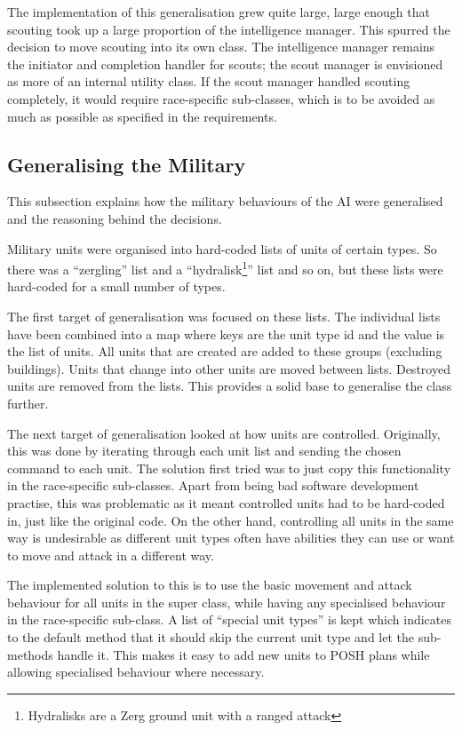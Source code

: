 \documentclass[11pt,openright,a4paper]{report}
\begin{document}
The implementation of this generalisation grew quite large, large enough that scouting took up a large proportion of the intelligence manager. This spurred the decision to move scouting into its own class. The intelligence manager remains the initiator and completion handler for scouts; the scout manager is envisioned as more of an internal utility class. If the scout manager handled scouting completely, it would require race-specific sub-classes, which is to be avoided as much as possible as specified in the requirements.

\subsection{Generalising the Military}
\label{MilitaryGen}
This subsection explains how the military behaviours of the AI were generalised and the reasoning behind the decisions.

Military units were organised into hard-coded lists of units of certain types. So there was a ``zergling'' list and a ``hydralisk\footnote{Hydralisks are a Zerg ground unit with a ranged attack}'' list and so on, but these lists were hard-coded for a small number of types.

The first target of generalisation was focused on these lists. The individual lists have been combined into a map where keys are the unit type id and the value is the list of units. All units that are created are added to these groups (excluding buildings). Units that change into other units are moved between lists. Destroyed units are removed from the lists. This provides a solid base to generalise the class further.

The next target of generalisation looked at how units are controlled. Originally, this was done by iterating through each unit list and sending the chosen command to each unit. The solution first tried was to just copy this functionality in the race-specific sub-classes. Apart from being bad software development practise, this was problematic as it meant controlled units had to be hard-coded in, just like the original code. On the other hand, controlling all units in the same way is undesirable as different unit types often have abilities they can use or want to move and attack in a different way.

The implemented solution to this is to use the basic movement and attack behaviour for all units in the super class, while having any specialised behaviour in the race-specific sub-class. A list of ``special unit types'' is kept which indicates to the default method that it should skip the current unit type and let the sub-methods handle it. This makes it easy to add new units to POSH plans while allowing specialised behaviour where necessary.
\end{document}
